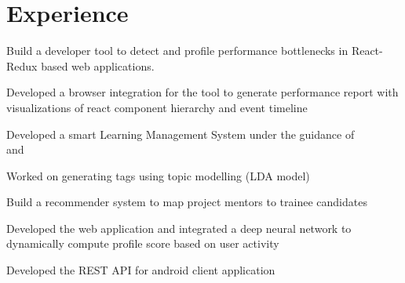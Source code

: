 \documentclass[]{deedy-resume-openfont}
\begin{document}
\hfill
\begin{minipage}[t]{0.66\textwidth} 


\section{Experience}
\vspace{1pt}
\vspace{\topsep} %
\begin{tightemize}
\vspace{1pt}
\item Build a developer tool to detect and profile performance bottlenecks in React-Redux based web applications.
\item Developed a browser integration for the tool to generate performance report with visualizations of react component hierarchy and event timeline
\end{tightemize}
\sectionsep

\begin{tightemize}
\item Developed a smart Learning Management System under the guidance of \\
 and
\item Worked on generating tags using topic modelling (LDA model)
\item Build a recommender system to map project mentors to trainee candidates
\item  Developed the web application and integrated a deep neural network to dynamically compute profile score based on user activity 
\item Developed the REST API for android client application 
\end{tightemize}
\sectionsep


\end{minipage}
\end{document}
